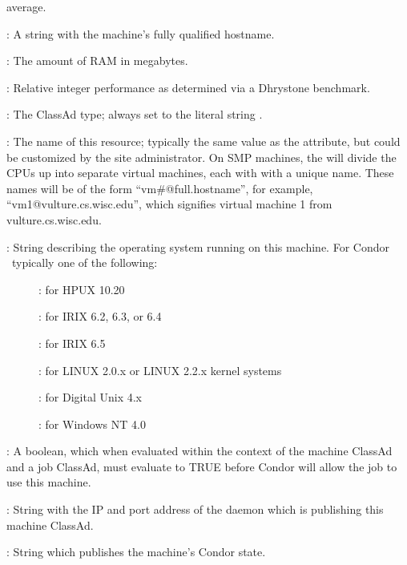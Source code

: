 \begin{description}
average.
%
\item[\AdAttr{Machine}] : A string with the machine's fully qualified hostname.
%
\item[\AdAttr{Memory}] : The amount of RAM in megabytes.
%
\item[\AdAttr{Mips}] : Relative integer performance as determined via a Dhrystone
benchmark.
%
\item[\AdAttr{MyType}] : The ClassAd type; always set to the literal string .
%
\item[\AdAttr{Name}] : The name of this resource; typically the same value as
the  attribute, but could be customized by the site
administrator.
On SMP machines, the  will divide the CPUs up into separate
virtual machines, each with with a unique name.
These names will be of the form ``vm\#@full.hostname'', for example,
``vm1@vulture.cs.wisc.edu'', which signifies virtual machine 1 from
vulture.cs.wisc.edu. 
%
\item[\AdAttr{OpSys}] : String describing the operating system running on this
machine.  For Condor \VersionNotice\ typically one of the following:
	\begin{description}
	\item[] : for HPUX 10.20
	\item[] : for IRIX 6.2, 6.3, or 6.4
	\item[] : for IRIX 6.5
	\item[] : for LINUX 2.0.x or LINUX 2.2.x kernel systems
	\item[] : for Digital Unix 4.x
	\item[]
	\item[]
	\item[]
	\item[]
	\item[] : for Windows NT 4.0
	\end{description}
%
\item[\AdAttr{Requirements}] : A boolean, which when evaluated within the context
of the machine ClassAd and a job ClassAd, must evaluate to
TRUE before Condor will allow the job to use this machine.
%
\item[\AdAttr{StartdIpAddr}] : String with the IP and port address of the
 daemon which is publishing this machine ClassAd.
%
\item[\AdAttr{State}] : String which publishes the machine's Condor state.

\end{description}
